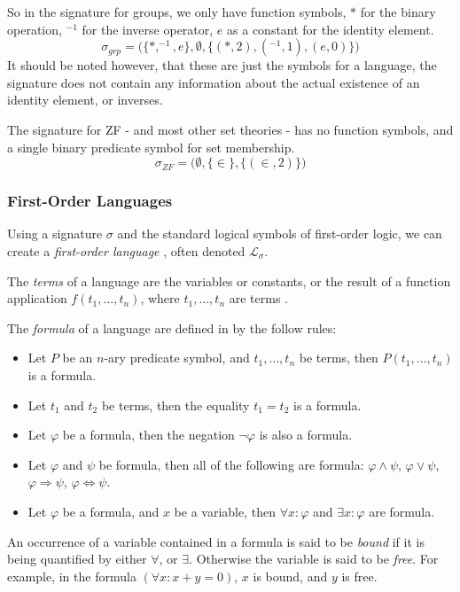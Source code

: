 \documentclass[11pt]{article}
\theoremstyle{definition}
\theoremstyle{theorem}
\theoremstyle{lemma}
\begin{document}
So in the signature for groups, we only have function symbols, $*$ for the binary operation, $^{-1}$ for the inverse operator, $e$ as a constant for the identity element.
$$\sigma_{\mathit{grp}} = \big(\{*,^{-1}, e\},\emptyset,\{(*, 2), (^{-1}, 1),(e,0)\}\big)$$
It should be noted however, that these are just the symbols for a language, the signature does not contain any information about the actual existence of an identity element, or inverses.

The signature for ZF - and most other set theories - has no function symbols, and a single binary predicate symbol for set membership.
$$\sigma_{\mathit{ZF}} = \big(\emptyset,\{\in\},\{(\in, 2)\})$$

\subsubsection{First-Order Languages}
Using a signature $\sigma$ and the standard logical symbols of first-order logic, we can create a \emph{first-order language} \cite[ch.~1]{stanmodel}, often denoted $\mathcal{L}_\sigma$.

The \emph{terms} of a language are the variables or constants, or the result of a function application $f(t_1,\ldots, t_n)$, where $t_1,\ldots,t_n$ are terms \cite[ch.~1.3]{selinger}.

The \emph{formula} of a language are defined in \cite[ch~1.4]{selinger}by the follow rules:
\begin{itemize}
  \item Let $P$ be an $n$-ary predicate symbol, and $t_1,\ldots,t_n$ be terms, then $P(t_1,\ldots,t_n)$ is a formula.
  \item Let $t_1$ and $t_2$ be terms, then the equality $t_1 = t_2$ is a formula.
  \item Let $\varphi$ be a formula, then the negation $\neg\varphi$ is also a formula.
  \item Let $\varphi$ and $\psi$ be formula, then all of the following are formula: $\varphi\wedge\psi$, $\varphi\vee\psi$, $\varphi\Rightarrow\psi$, $\varphi\Leftrightarrow\psi$.
  \item Let $\varphi$ be a formula, and $x$ be a variable, then $\forall x:\varphi$ and $\exists x:\varphi$ are formula.
\end{itemize}
An occurrence of a variable contained in a formula is said to be \emph{bound} if it is being quantified by either $\forall$, or $\exists$.
Otherwise the variable is said to be \emph{free}. For example, in the formula $(\forall x: x+y=0)$, $x$ is bound, and $y$ is free.
\end{document}
